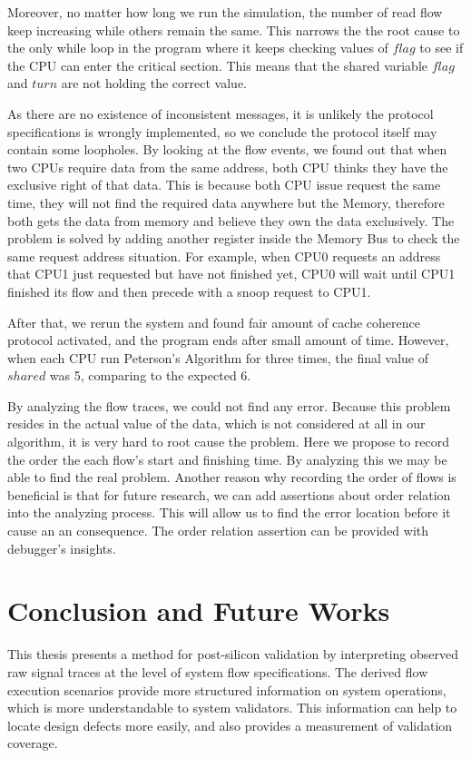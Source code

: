 \documentclass[12pt,frontmatter,copyright,thesis]{usfmanus}
\begin{document}
Moreover,
no matter how long we run the simulation, the number of read flow keep increasing while
others remain the same.
This narrows the the root cause to
the only while loop in the program where it
keeps checking values of $flag$ to see
if the CPU can enter the critical section. 
This means that the
shared variable $flag$ and $turn$ are not holding the correct value.

As there are no existence of inconsistent messages,
it is unlikely the protocol specifications is wrongly implemented,
so we conclude the protocol itself may contain some
loopholes.
By looking at the flow events, we found out that
when two CPUs require data from the same address,
both CPU thinks they have the exclusive right of that data.
This is because both CPU issue request the same time, they will not 
find the required data anywhere but the Memory, therefore
both gets the data from memory and believe they own
the data exclusively.
The problem is solved by adding another register inside the Memory Bus to check
the same request address situation. For example,
when CPU0 requests an address that CPU1
just requested but have not finished yet, CPU0 will wait until CPU1
finished its flow and then precede with a snoop request to CPU1.

 
After that, we rerun the system and found fair amount of
 cache coherence protocol activated, and
 the program ends after small amount of time. 
 However, when each CPU run Peterson's Algorithm
 for three times, the final value of $shared$ was 5, comparing to the expected 6.
 
 By analyzing the flow traces, we could not find any error. Because this problem
 resides in the actual value of the data, which is not considered at all in our algorithm,
 it is very hard to root cause the problem. Here we propose to record the order
 the each flow's start and finishing time. By analyzing this we may be able to
 find the real problem. Another reason why recording the order of flows is beneficial
 is that for future research, we can add assertions about order relation into the analyzing
 process. This will allow us to find the error location before it cause an an consequence.
 The order relation assertion can be provided with debugger's insights.
 

\chapter{Conclusion and Future Works}
This thesis presents a method for post-silicon validation by
interpreting observed raw signal traces at the level of
system flow specifications.  The derived flow execution
scenarios provide more structured information on system
operations, which is more understandable to system
validators.  This information can help to locate design
defects more easily, and also provides a measurement of
validation coverage.
\end{document}
